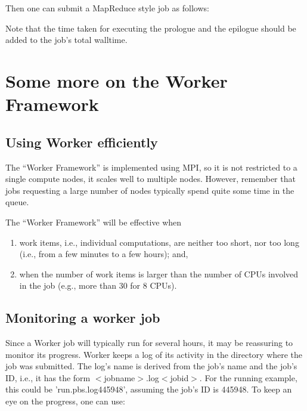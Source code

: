 Then one can submit a MapReduce style job as follows:

Note that the time taken for executing the prologue and the epilogue should be added to the job's total walltime.

\section{Some more on the Worker Framework}

\subsection{Using Worker efficiently}

The ``Worker Framework'' is implemented using MPI, so it is not restricted to a single compute nodes, it scales well to multiple nodes. However, remember that jobs requesting a large number of nodes typically spend quite some time in the queue.

The ``Worker Framework'' will be effective when

\begin{enumerate}
\item  work items, i.e., individual computations, are neither too short, nor too long (i.e., from a few minutes to a few hours); and,
\item  when the number of work items is larger than the number of CPUs involved in the job (e.g., more than 30 for 8 CPUs).
\end{enumerate}

\subsection{Monitoring a worker job}

Since a Worker job will typically run for several hours, it may be reassuring to monitor its progress. Worker keeps a log of its activity in the directory where the job was submitted. The log's name is derived from the job's name and the job's ID, i.e., it has the form $<$jobname$>$.log$<$jobid$>$. For the running example, this could be 'run.pbs.log445948', assuming the job's ID is 445948. To keep an eye on the progress, one can use:

